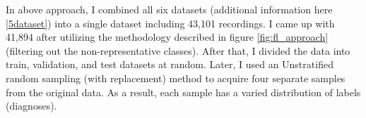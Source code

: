 In above approach, I combined all six datasets (additional information here \ref{5dataset}) into a single dataset including 43,101 recordings. I came up with 41,894 after utilizing the methodology described in figure \ref{fig:fl_approach} (filtering out the non-representative classes). After that, I divided the data into train, validation, and test datasets at random. Later, I used an Unstratified random sampling (with replacement) method to acquire four separate samples from the original data. As a result, each sample has a varied distribution of labels (diagnoses).






























